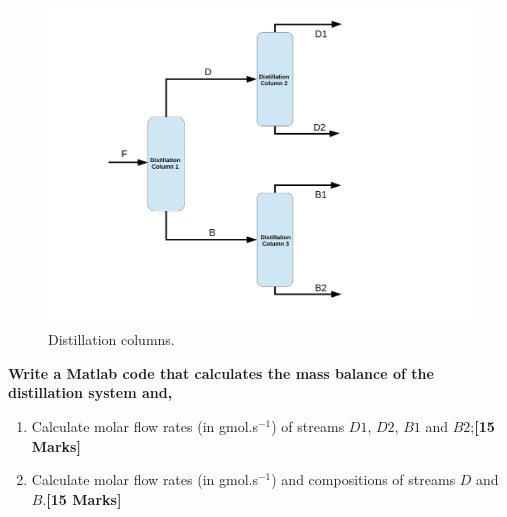 \documentclass[12pts,a4paper,amsmath,amssymb,floatfix]{article}%
\begin{document}
\begin{enumerate}[label=\bfseries Problem \arabic*:]
\begin{figure}[h]
\begin{center}
\includegraphics[width=15.cm,height=10.cm,clip]{./Pics/Practical_Distillation.pdf}
\caption{Distillation columns. }
\label{distillationcolumn}
\end{center}
\end{figure}

{\bf Write a Matlab code that calculates the mass balance of the distillation system and,}
\begin{enumerate}[label=\bfseries Task \arabic*]
\item Calculate molar flow rates (in gmol.s$^{-1}$) of streams $D1$, $D2$, $B1$ and $B2$;\hfill{\bf[15 Marks]}
\item Calculate molar flow rates (in gmol.s$^{-1}$) and compositions of streams $D$ and $B$.\hfill{\bf[15 Marks]}
\end{enumerate}

\end{enumerate}
\clearpage
\end{document}
